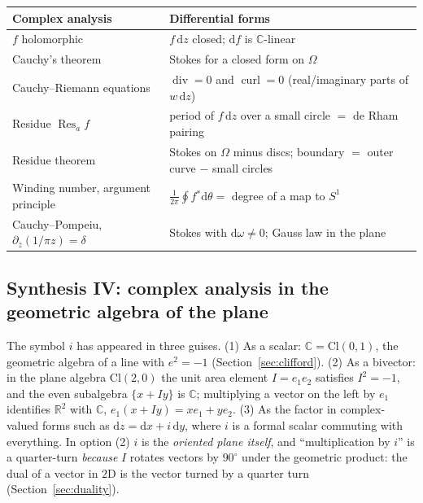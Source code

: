 \documentclass[11pt,a4paper]{article}
\renewcommand{\arraystretch}{1.25}
\numberwithin{equation}{section}
\theoremstyle{definition}
\theoremstyle{plain}
\newcommand{\R}{\mathbb{R}}
\newcommand{\C}{\mathbb{C}}
\newcommand{\dd}{\mathrm{d}}
\newcommand{\Res}{\operatorname{Res}}
\newcommand{\Cl}{\mathrm{Cl}}
\newcommand{\pb}{{}^{*}}                            %
\newcommand{\pss}{I}
\begin{document}
\begin{center}
\small
\renewcommand{\arraystretch}{1.3}
\begin{tabular}{@{}p{4.6cm}p{9.6cm}@{}}
\toprule
\textbf{Complex analysis} & \textbf{Differential forms}\\
\midrule
$f$ holomorphic & $f\,\dd z$ closed; $\dd f$ is $\C$-linear\\
Cauchy's theorem & Stokes for a closed form on $\Omega$\\
Cauchy--Riemann equations & $\operatorname{div}=0$ and $\operatorname{curl}=0$ (real/imaginary parts of $w\,\dd z$)\\
Residue $\Res_af$ & period of $f\,\dd z$ over a small circle $=$ de Rham pairing\\
Residue theorem & Stokes on $\Omega$ minus discs; boundary $=$ outer curve $-$ small circles\\
Winding number, argument principle & $\frac1{2\pi}\oint f\pb\dd\theta=$ degree of a map to $S^1$\\
Cauchy--Pompeiu, $\partial_{\bar z}(1/\pi z)=\delta$ & Stokes with $\dd\omega\neq0$; Gauss law in the plane\\
\bottomrule
\end{tabular}
\end{center}

\subsection{Synthesis IV: complex analysis in the geometric algebra of the plane}\label{sec:synth4}

\begin{synthesis}
The symbol $i$ has appeared in three guises. (1) As a scalar: $\C=\Cl(0,1)$, the geometric algebra of a line with $e^2=-1$ (Section~\ref{sec:clifford}). (2) As a bivector: in the plane algebra $\Cl(2,0)$ the unit area element $\pss=e_1e_2$ satisfies $\pss^2=-1$, and the even subalgebra $\{x+\pss y\}$ is $\C$; multiplying a vector on the left by $e_1$ identifies $\R^2$ with $\C$, $e_1(x+\pss y)=xe_1+ye_2$. (3) As the factor in complex-valued forms such as $\dd z=\dd x+i\,\dd y$, where $i$ is a formal scalar commuting with everything.
In option (2) $i$ is the \emph{oriented plane itself}, and ``multiplication by $i$'' is a quarter-turn \emph{because} $\pss$ rotates vectors by $90^\circ$ under the geometric product: the dual of a vector in $2$D is the vector turned by a quarter turn (Section~\ref{sec:duality}).
\end{synthesis}
\end{document}
